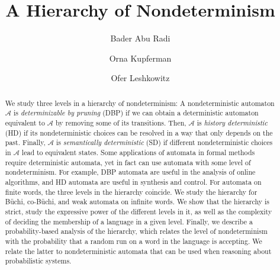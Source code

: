 \documentclass{lmcs}
\newcommand{\set}[1]{\{ #1 \}}
\begin{document}
\title[A Hierarchy of Nondeterminism]{A Hierarchy of Nondeterminism\rsuper*}

\author[B.~Abu~Radi]{Bader Abu Radi}
\author[O.~Kupferman]{Orna Kupferman}
\author[O.~Leshkowitz]{Ofer Leshkowitz}

\address{School of Engineering and Computer Science, Hebrew University, Jerusalem, Israel}


\newtheorem{remark}[thm]{Remark} %

\newcommand{\buchi}{B\"uchi\xspace}
\newcommand{\A}{{\mathcal A}}
\newcommand{\B}{{\mathcal B}}
\newcommand{\C}{{\mathcal C}}
\newcommand{\D}{{\mathcal D}}
\newcommand{\U}{{\mathcal U}}
\renewcommand{\S}{{\mathcal S}}
\newcommand{\T}{{\mathcal T}}
\newcommand{\M}{{\mathcal M}}
\newcommand{\F}{{\mathcal F}}
\newcommand{\K}{{\mathcal K}}
\newcommand{\Pcal}{{\mathcal P}}
\newcommand\floor[1]{\lfloor#1\rfloor}
\newcommand{\zug}[1]{\left\langle #1 \right\rangle}
\renewcommand{\set}[1]{\left\{ #1 \right\}}
\newcommand{\G}{{\mathcal G}}
\renewcommand{\P}{\mathbb{P}}
\renewcommand{\Pr}{\mathrm{Pr}}
\newcommand{\dist}{\mathrm{dist}}
\newcommand{\last}{\mathrm{last}}
\newcommand{\cs}{\mbox{\it co-safe}}
\renewcommand{\S}{{\mathcal S}}
\newcommand{\N}{{\mathcal N}}
\newcommand{\dxw}{DXW\xspace}
\newcommand{\dxws}{DXWs\xspace}
\newcommand{\nxw}{NXW\xspace}
\newcommand{\nxws}{NXWs\xspace}

\begin{abstract}
We study three levels in a hierarchy of nondeterminism: A nondeterministic automaton $\A$ is {\em determinizable by pruning\/} (DBP) if we can obtain a deterministic automaton equivalent to $\A$ by removing some of its transitions. Then, $\A$ is {\em history deterministic\/} (HD) if its nondeterministic choices can be resolved in a way that only depends on the past. Finally, $\A$ is {\em semantically deterministic\/} (SD) if different nondeterministic choices in $\A$ lead to equivalent states. Some applications of automata in formal methods require deterministic automata, yet in fact can use automata with some level of nondeterminism. For example, DBP automata are useful in the analysis of online algorithms, and HD automata are useful in synthesis and control. For automata on finite words, the three levels in the hierarchy coincide. We study the hierarchy for \buchi, co-\buchi, and weak automata on infinite words. We show that the hierarchy is strict, study the expressive power of the different levels in it, as well as the complexity of deciding the membership of a language in a given level. Finally, we describe a probability-based analysis of the hierarchy, which relates the level of nondeterminism with the probability that a random run on a word in the language is accepting. 
We relate the latter to nondeterministic automata that can be used when reasoning about probabilistic systems.
\end{abstract}
\maketitle
\end{document}
